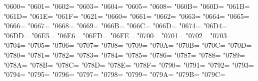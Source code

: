 \XeTeXcharclass"0600=\KclassArabU
\XeTeXcharclass"0601=\KclassArabU
\XeTeXcharclass"0602=\KclassArabU
\XeTeXcharclass"0603=\KclassArabU
\XeTeXcharclass"0604=\KclassArabU
\XeTeXcharclass"0605=\KclassArabU
\XeTeXcharclass"0608=\KclassArabU
\XeTeXcharclass"060B=\KclassArabU
\XeTeXcharclass"060D=\KclassArabU
\XeTeXcharclass"061B=\KclassArabU
\XeTeXcharclass"061D=\KclassArabU
\XeTeXcharclass"061E=\KclassArabU
\XeTeXcharclass"061F=\KclassArabU
\XeTeXcharclass"0621=\KclassArabU
\XeTeXcharclass"0660=\KclassArabU
\XeTeXcharclass"0661=\KclassArabU
\XeTeXcharclass"0662=\KclassArabU
\XeTeXcharclass"0663=\KclassArabU
\XeTeXcharclass"0664=\KclassArabU
\XeTeXcharclass"0665=\KclassArabU
\XeTeXcharclass"0666=\KclassArabU
\XeTeXcharclass"0667=\KclassArabU
\XeTeXcharclass"0668=\KclassArabU
\XeTeXcharclass"0669=\KclassArabU
\XeTeXcharclass"066B=\KclassArabU
\XeTeXcharclass"066C=\KclassArabU
\XeTeXcharclass"066D=\KclassArabU
\XeTeXcharclass"0674=\KclassArabU
\XeTeXcharclass"06D4=\KclassArabU
\XeTeXcharclass"06DD=\KclassArabU
\XeTeXcharclass"06E5=\KclassArabU
\XeTeXcharclass"06E6=\KclassArabU
\XeTeXcharclass"06FD=\KclassArabU
\XeTeXcharclass"06FE=\KclassArabU
\XeTeXcharclass"0700=\KclassArabU
\XeTeXcharclass"0701=\KclassArabU
\XeTeXcharclass"0702=\KclassArabU
\XeTeXcharclass"0703=\KclassArabU
\XeTeXcharclass"0704=\KclassArabU
\XeTeXcharclass"0705=\KclassArabU
\XeTeXcharclass"0706=\KclassArabU
\XeTeXcharclass"0707=\KclassArabU
\XeTeXcharclass"0708=\KclassArabU
\XeTeXcharclass"0709=\KclassArabU
\XeTeXcharclass"070A=\KclassArabU
\XeTeXcharclass"070B=\KclassArabU
\XeTeXcharclass"070C=\KclassArabU
\XeTeXcharclass"070D=\KclassArabU
\XeTeXcharclass"0780=\KclassArabU
\XeTeXcharclass"0781=\KclassArabU
\XeTeXcharclass"0782=\KclassArabU
\XeTeXcharclass"0783=\KclassArabU
\XeTeXcharclass"0784=\KclassArabU
\XeTeXcharclass"0785=\KclassArabU
\XeTeXcharclass"0786=\KclassArabU
\XeTeXcharclass"0787=\KclassArabU
\XeTeXcharclass"0788=\KclassArabU
\XeTeXcharclass"0789=\KclassArabU
\XeTeXcharclass"078A=\KclassArabU
\XeTeXcharclass"078B=\KclassArabU
\XeTeXcharclass"078C=\KclassArabU
\XeTeXcharclass"078D=\KclassArabU
\XeTeXcharclass"078E=\KclassArabU
\XeTeXcharclass"078F=\KclassArabU
\XeTeXcharclass"0790=\KclassArabU
\XeTeXcharclass"0791=\KclassArabU
\XeTeXcharclass"0792=\KclassArabU
\XeTeXcharclass"0793=\KclassArabU
\XeTeXcharclass"0794=\KclassArabU
\XeTeXcharclass"0795=\KclassArabU
\XeTeXcharclass"0796=\KclassArabU
\XeTeXcharclass"0797=\KclassArabU
\XeTeXcharclass"0798=\KclassArabU
\XeTeXcharclass"0799=\KclassArabU
\XeTeXcharclass"079A=\KclassArabU
\XeTeXcharclass"079B=\KclassArabU
\XeTeXcharclass"079C=\KclassArabU
